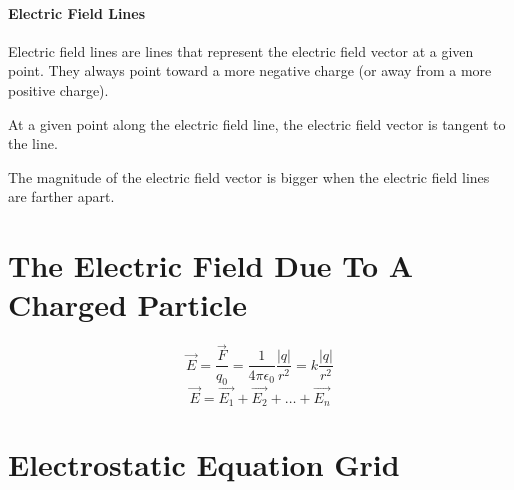 \documentclass{article}
\begin{document}
        \paragraph{Electric Field Lines}
        Electric field lines are lines that represent the electric field vector at a given point. They always point toward a more negative charge (or away from a more positive charge).

        At a given point along the electric field line, the electric field vector is tangent to the line.

        The magnitude of the electric field vector is bigger when the electric field lines are farther apart.
    
    \section{The Electric Field Due To A Charged Particle}

        \begin{equation}
            \vec{E} = \frac{\vec{F}}{q_0} = \frac{1}{4\pi\epsilon_0} \frac{\left|q\right|}{r^2} = k \frac{\left|q\right|}{r^2}
        \end{equation}
        \begin{equation}
            \vec{E} = \vec{E_1} + \vec{E_2} + \ldots + \vec{E_n}
        \end{equation}

    \section*{Electrostatic Equation Grid}
\end{document}
